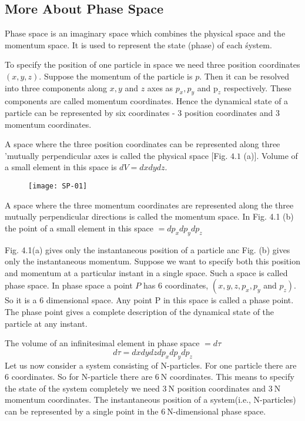 \subsection{More About Phase Space}
Phase space is an imaginary space which combines the physical space and the momentum space. It is used to represent the state (phase) of each śystem.\\
\par To specify the position of one particle in space we need three position coordinates $(x, y, z)$. Suppose the momentum of the particle is $p$. Then it can be resolved into three components along $x, y$ and $z$ axes as $p_{x}, p_{y}$ and $\mathrm{p}_{z}$ respectively. These components are called momentum coordinates. Hence the dynamical state of a particle can be represented by six coordinates - 3 position coordinates and 3 momentum coordinates.\\
\par A space where the three position coordinates can be represented along three 'mutually perpendicular axes is called the physical space [Fig. $4.1$ (a)]. Volume of a small element in this space is $d V=d x d y d z$.
\begin{figure}[H]
	\centering
	\texttt{[image: SP-01]}
\end{figure}
\par A space where the three momentum coordinates are represented along the three mutually perpendicular directions is called the momentum space. In Fig. 4.1 (b) the point of a small element in this space $=d p_{x} d p_{y} d p_{z}$\\
\par Fig. 4.1(a) gives only the instantaneous position of a particle anc Fig. (b) gives only the instantaneous momentum. Suppose we want to specify both this position and momentum at a particular instant in a single space. Such a space is called phase space. In phase space a point $P$ has 6 coordinates, $\left(x, y, z, p_{x}, p_{y}\right.$ and $\left.p_{z}\right)$. So it is a 6 dimensional space. Any point $\mathrm{P}$ in this space is called a phase point. The phase point gives a complete description of the dynamical state of the particle at any instant.\\
\par The volume of an infinitesimal element in phase space $=d \tau$
$$
d \tau=d x d y d z d p_{x} d p_{y} d p_{z}
$$
Let us now consider a system consisting of N-particles. For one particle there are 6 coordinates. So for N-particle there are $6 \mathrm{~N}$ coordinates. This means to specify the state of the system completely we need $3 \mathrm{~N}$ position coordinates and $3 \mathrm{~N}$ momentum coordinates. The instantaneous position of a system(i.e., N-particles) can be represented by a single point in the $6 \mathrm{~N}$-dimensional phase space.
